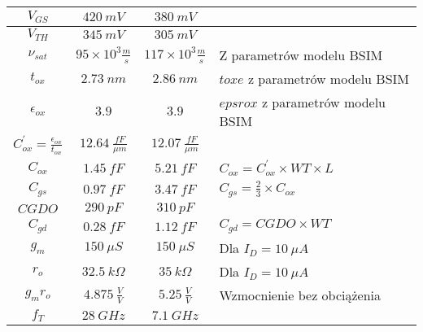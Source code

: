 \documentclass[twoside,pl,final]{labman}
\begin{document}
\begin{table}[htbp]
\begin{tabular}{ || c | c | c | p{} || }
    $V_{GS}$                & $420~mV$                     & $380~mV$       &                                              \\ \hline
    $V_{TH}$                & $345~mV$                     & $305~mV$       &                                              \\ \hline
    $\nu_{sat}$             & $95 \times 10^3 \frac{m}{s}$ & $117 \times 10^3 \frac{m}{s}$ & Z parametrów modelu BSIM      \\ \hline
    $t_{ox}$                & $2.73~nm$                    & $2.86~nm$      & $toxe$ z parametrów modelu BSIM              \\ \hline
    $\epsilon_{ox}$         & $3.9$                        & $3.9$          & $epsrox$ z parametrów modelu BSIM            \\ \hline
    $C_{ox}^\prime = \frac{\epsilon_{ox}}{t_{ox}}$
                            & $12.64~\frac{fF}{\mu{}m}$    & $12.07~\frac{fF}{\mu{}m}$ & \\ \hline
    $C_{ox}$                & $1.45~fF$                    & $5.21~fF$          & $C_{ox} = C_{ox}^\prime \times WT \times L$  \\ \hline
    $C_{gs}$                & $0.97~fF$                    & $3.47~fF$          & $C_{gs} = \frac{2}{3} \times C_{ox}$         \\ \hline
    $CGDO$                  & $290~pF$                     & $310~pF$           &                                              \\ \hline
    $C_{gd}$                & $0.28~fF$                    & $1.12~fF$          & $C_{gd} = CGDO \times WT$                    \\ \hline
    $g_{m}$                 & $150~\mu{}S$                 & $150~\mu{}S$       & Dla $I_D = 10~\mu{}A$                        \\ \hline
    $r_{o}$                 & $32.5~k\Omega$               & $35~k\Omega$       & Dla $I_D = 10~\mu{}A$                        \\ \hline
    $g_mr_o$                & $4.875~\frac{V}{V}$          & $5.25~\frac{V}{V}$ & Wzmocnienie bez obciążenia                   \\ \hline
    $f_T$                   & $28~GHz$                     & $7.1~GHz$          & \\
    \hline \hline
  \end{tabular}
\end{table}



\end{document}
